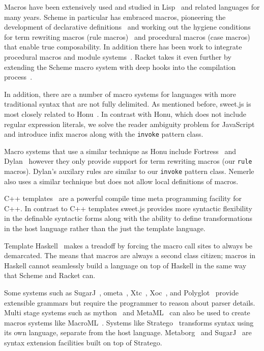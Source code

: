 \documentclass[preprint,10pt]{sigplanconf}
\begin{document}
Macros have been extensively used and studied in Lisp~\cite{Foderaro1983,Pitman1980} and related languages for many years. Scheme in particular has embraced macros, pioneering the development of declarative definitions~\cite{Kohlbecker1987} and working out the hygiene conditions for term rewriting macros (rule macros)~\cite{Clinger1991} and procedural macros (case macros)~\cite{Hieb1992} that enable true composability.
In addition there has been work to integrate procedural macros and module systems~\cite{Flatt2002,Ghuloum2007}.
Racket takes it even further by extending the Scheme macro system with deep hooks into the compilation process~\cite{Flatt2012,Tobin-Hochstadt2011}.

In addition, there are a number of macro systems for languages with more traditional syntax that are not fully delimited. 
As mentioned before, sweet.js is most closely related to Honu~\cite{Rafkind2012,Rafkind2013}. In contrast with Honu, which does not include regular expression literals, we solve the reader ambiguity problem for JavaScript and introduce infix macros along with the \verb!invoke! pattern class.


Macro systems that use a similar technique as Honu include 
Fortress~\cite{Allen2009} and
Dylan~\cite{Bachrach1999} however they only provide support for term rewriting macros (our \verb!rule! macros).
Dylan's auxilary rules are similar to our \verb!invoke! pattern class.
Nemerle~\cite{Skalski2004} also uses a similar technique but does not allow local definitions of macros.

C++ templates~\cite{Alexandrescu2001} are a powerful compile time meta programming facility for C++. In contrast to C++ templates sweet.js provides more syntactic flexibility in the definable syntactic forms along with the ability to define transformations in the host language rather than the just the template language.

Template Haskell~\cite{Sheard2002} makes a treadoff by forcing the macro call sites to always be demarcated. The means that macros are always a second class citizen; macros in Haskell cannot seamlessly build a language on top of Haskell in the same way that Scheme and Racket can.

Some systems such as 
SugarJ~\cite{Erdweg2011},
ometa~\cite{Warth2007},
Xtc~\cite{Grimm2006},
Xoc~\cite{Cox2008}, and Polyglot~\cite{Nystrom2003} provide extensible grammars but require the programmer to reason about parser details.
Multi stage systems such as mython~\cite{Riehl2009} and MetaML~\cite{Taha1997,Martel1997} can also be used to create macros systems like MacroML~\cite{Ganz2001}.
Systems like
Stratego~\cite{Visser2004} transforms syntax using its own language, separate from the host language. Metaborg~\cite{Bravenboer2004} and SugarJ~\cite{Erdweg2011} are syntax extension facilities built on top of Stratego.
\end{document}
